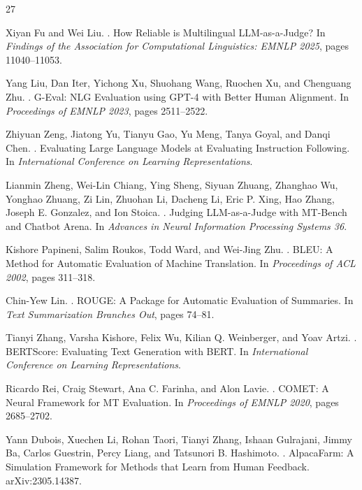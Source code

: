 \documentclass[10pt,twocolumn]{article}
\begin{document}
\begin{thebibliography}{27}

Xiyan Fu and Wei Liu.
.
\newblock How Reliable is Multilingual LLM-as-a-Judge?
\newblock In \emph{Findings of the Association for Computational Linguistics: EMNLP 2025}, pages 11040--11053.

Yang Liu, Dan Iter, Yichong Xu, Shuohang Wang, Ruochen Xu, and Chenguang Zhu.
.
\newblock G-Eval: NLG Evaluation using GPT-4 with Better Human Alignment.
\newblock In \emph{Proceedings of EMNLP 2023}, pages 2511--2522.

Zhiyuan Zeng, Jiatong Yu, Tianyu Gao, Yu Meng, Tanya Goyal, and Danqi Chen.
.
\newblock Evaluating Large Language Models at Evaluating Instruction Following.
\newblock In \emph{International Conference on Learning Representations}.

Lianmin Zheng, Wei-Lin Chiang, Ying Sheng, Siyuan Zhuang, Zhanghao Wu, Yonghao Zhuang, Zi Lin, Zhuohan Li, Dacheng Li, Eric P. Xing, Hao Zhang, Joseph E. Gonzalez, and Ion Stoica.
.
\newblock Judging LLM-as-a-Judge with MT-Bench and Chatbot Arena.
\newblock In \emph{Advances in Neural Information Processing Systems 36}.

Kishore Papineni, Salim Roukos, Todd Ward, and Wei-Jing Zhu.
.
\newblock BLEU: A Method for Automatic Evaluation of Machine Translation.
\newblock In \emph{Proceedings of ACL 2002}, pages 311--318.

Chin-Yew Lin.
.
\newblock ROUGE: A Package for Automatic Evaluation of Summaries.
\newblock In \emph{Text Summarization Branches Out}, pages 74--81.

Tianyi Zhang, Varsha Kishore, Felix Wu, Kilian Q. Weinberger, and Yoav Artzi.
.
\newblock BERTScore: Evaluating Text Generation with BERT.
\newblock In \emph{International Conference on Learning Representations}.

Ricardo Rei, Craig Stewart, Ana C. Farinha, and Alon Lavie.
.
\newblock COMET: A Neural Framework for MT Evaluation.
\newblock In \emph{Proceedings of EMNLP 2020}, pages 2685--2702.

Yann Dubois, Xuechen Li, Rohan Taori, Tianyi Zhang, Ishaan Gulrajani, Jimmy Ba, Carlos Guestrin, Percy Liang, and Tatsunori B. Hashimoto.
.
\newblock AlpacaFarm: A Simulation Framework for Methods that Learn from Human Feedback.
\newblock arXiv:2305.14387.


\end{thebibliography}
\end{document}
